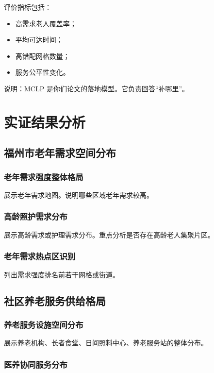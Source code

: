 \documentclass[UTF8,zihao=-4,a4paper,fontset=none]{ctexart}
\begin{document}
评价指标包括：

\begin{itemize}
\item 高需求老人覆盖率；
\item 平均可达时间；
\item 高错配网格数量；
\item 服务公平性变化。
\end{itemize}

说明：MCLP 是你们论文的落地模型。它负责回答“补哪里”。

\section{实证结果分析}

\subsection{福州市老年需求空间分布}

\subsubsection{老年需求强度整体格局}

展示老年需求地图。说明哪些区域老年需求较高。

\subsubsection{高龄照护需求分布}

展示高龄需求或护理需求分布。重点分析是否存在高龄老人集聚片区。

\subsubsection{老年需求热点区识别}

列出需求强度排名前若干网格或街道。

\subsection{社区养老服务供给格局}

\subsubsection{养老服务设施空间分布}

展示养老机构、长者食堂、日间照料中心、养老服务站的整体分布。

\subsubsection{医养协同服务分布}
\end{document}

